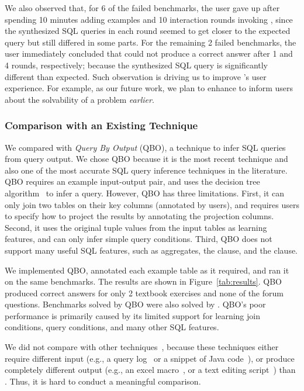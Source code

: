 We also observed that,
for 6 of the failed benchmarks, the user
gave up after spending 10 minutes adding
examples and
10 interaction rounds invoking \ourtool, since the synthesized
SQL queries in each round seemed to get closer to the expected
query but still differed in some parts.
For the remaining 2 failed benchmarks, the user immediately
concluded that \ourtool could not produce a correct
answer after 1 and 4 rounds, respectively;
because the synthesized SQL
query is significantly different than expected.
Such observation is driving us to improve \ourtool's
user experience. For example, as our future work,
we plan to enhance \ourtool to inform users
about the solvability of a problem
\textit{earlier}.



\subsubsection{Comparison with an Existing Technique}
\label{sec:comparison}
We compared \ourtool with \textit{Query By Output} (QBO),
a technique to infer SQL
queries~\cite{Tran:2009} from query output.
We chose QBO because it is the most recent technique and also one
of the most accurate SQL query inference techniques in
the literature. QBO requires an example input-output pair, and
uses the decision tree algorithm~\cite{Quinlan:1986} to infer a query.
However, QBO has three limitations. First, 
it can only join two tables on their key columns (annotated by users), and requires
users to specify how to project the results
by annotating the projection columns.
Second, it uses the original tuple values
from the input tables as learning features, and can only
infer simple query conditions. Third, QBO does not support
many useful SQL features, such as aggregates, the 
clause, and the  clause.

We implemented QBO, annotated
each example table as it required, and ran it
on the same benchmarks. The results are shown in Figure~\ref{tab:results}.
QBO produced correct answers
for only 2 textbook exercises and none of the forum questions.
Benchmarks solved by QBO were also solved by \ourtool.
QBO's poor performance is primarily caused by its
limited support for learning join conditions,
query conditions, and many other SQL features.

We did not compare \ourtool with other techniques~\cite{Howe:2011,
abs-1208-2013, Harris:2011, Kandel:2011}, because
these techniques either require different input
(e.g., a query log~\cite{Khoussainova:2010, Howe:2011}
or a snippet of Java code~\cite{abs-1208-2013}), 
or produce completely different
output (e.g., an excel macro~\cite{Harris:2011}, or a
text editing script~\cite{Kandel:2011}) than \ourtool.
Thus, it is hard to conduct a meaningful comparison.

